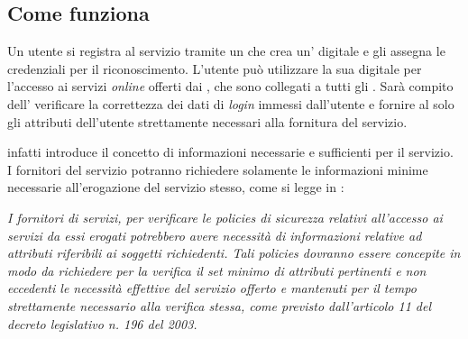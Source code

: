 \subsection{Come funziona}
Un utente si registra al servizio tramite un  che crea un’ digitale e gli assegna le credenziali per il riconoscimento. L'utente può utilizzare la sua  digitale per l'accesso ai servizi \textit{online} offerti dai , che sono collegati a tutti gli . Sarà compito dell’ verificare la correttezza dei dati di \textit{login} immessi dall'utente e fornire al  solo gli attributi dell'utente strettamente necessari alla fornitura del servizio.

 infatti introduce il concetto di informazioni necessarie e sufficienti per il servizio. I fornitori del servizio potranno richiedere solamente le informazioni minime necessarie all'erogazione del servizio stesso, come si legge in \cite{reg:spid}:

\begin{displayquote}
\textit{I fornitori di servizi, per verificare le \textit{policies} di sicurezza relativi all'accesso ai servizi da essi erogati potrebbero avere necessità di informazioni relative ad attributi riferibili ai soggetti richiedenti. Tali \textit{policies} dovranno essere concepite in modo da richiedere per la verifica il set minimo di attributi pertinenti e non eccedenti le necessità effettive del servizio offerto e mantenuti per il tempo strettamente necessario alla verifica stessa, come previsto dall'articolo 11 del decreto legislativo n. 196 del 2003.}
\end{displayquote}

